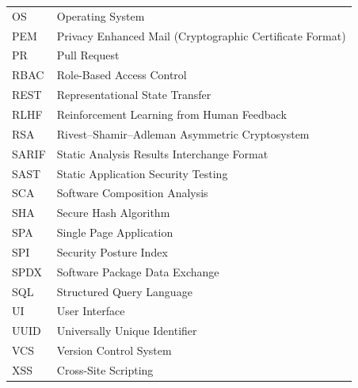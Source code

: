 \begin{longtable}{p{} p{}}
OS & Operating System \\
PEM & Privacy Enhanced Mail (Cryptographic Certificate Format) \\
PR & Pull Request \\
RBAC & Role-Based Access Control \\
REST & Representational State Transfer \\
RLHF & Reinforcement Learning from Human Feedback \\
RSA & Rivest--Shamir--Adleman Asymmetric Cryptosystem \\
SARIF & Static Analysis Results Interchange Format \\
SAST & Static Application Security Testing \\
SCA & Software Composition Analysis \\
SHA & Secure Hash Algorithm \\
SPA & Single Page Application \\
SPI & Security Posture Index \\
SPDX & Software Package Data Exchange \\
SQL & Structured Query Language \\
UI & User Interface \\
UUID & Universally Unique Identifier \\
VCS & Version Control System \\
XSS & Cross-Site Scripting \\
\end{longtable}

